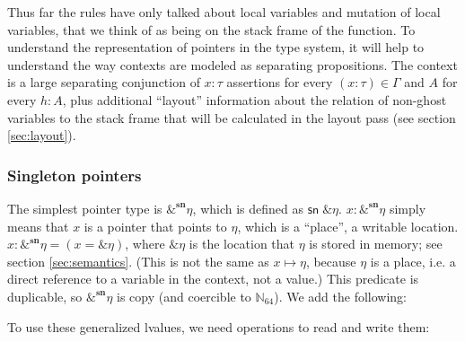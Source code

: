 \documentclass[acmsmall,nonacm]{acmart}
\newcommand*{\N}{\mathbb{N}}
\newcommand{\proves}{\vdash}
\newcommand{\makes}{\dashv}
\begin{document}
Thus far the rules have only talked about local variables and mutation of local variables, that we think of as being on the stack frame of the function. To understand the representation of pointers in the type system, it will help to understand the way contexts are modeled as separating propositions. The context is a large separating conjunction of $\boxed{x:\tau}$ assertions for every $(x:\tau)\in\Gamma$ and $A$ for every $h:A$, plus additional ``layout'' information about the relation of non-ghost variables to the stack frame that will be calculated in the layout pass (see section \ref{sec:layout}).

\subsubsection{Singleton pointers}

The simplest pointer type is $\&^\mathbf{sn}\eta$, which is defined as $\mathsf{sn}\;\&\eta$. $x:\&^\mathbf{sn}\eta$ simply means that $x$ is a pointer that points to $\eta$, which is a ``place'', a writable location. $\boxed{x:\&^\mathbf{sn}\eta}=(x=\&\eta)$, where $\&\eta$ is the location that $\eta$ is stored in memory; see section \ref{sec:semantics}. (This is not the same as $x\mapsto\eta$, because $\eta$ is a place, i.e. a direct reference to a variable in the context, not a value.) This predicate is duplicable, so $\&^\mathbf{sn}\eta$ is \textsf{copy} (and coercible to $\N_{64}$). We add the following:

To use these generalized lvalues, we need operations to read and write them:

\end{document}
